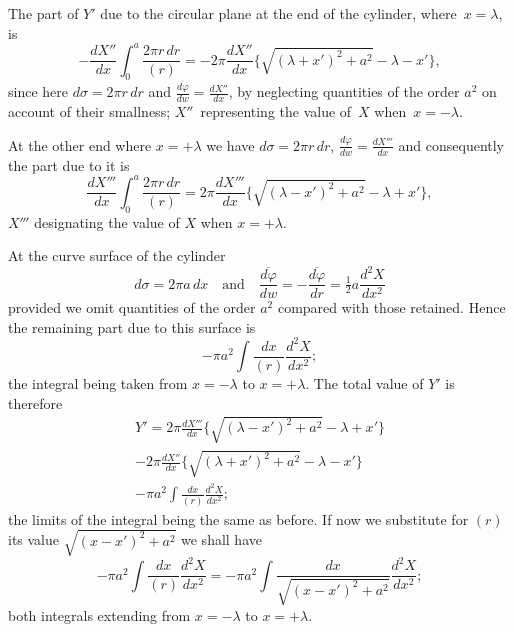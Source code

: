 \documentclass[11pt,notitlepage]{amsart}
\renewcommand{\phi}{\varphi}
\begin{document}
The part of $Y'$ due to the circular plane at the end of the cylinder,
where~$x=\lambda$, is
\[
-\frac{dX''}{dx}\int_0^a\frac{2\pi r\,dr}{(r)}
=-2\pi\frac{dX''}{dx}
\biggl\{\sqrt{(\lambda+x')^2+a^2}-\lambda-x'\biggr\},
\]
since here $d\sigma=2\pi r\,dr$
and $\frac{\overline{d\phi}}{dw}=\frac{dX''}{dx}$,
by neglecting quantities of the order
$a^2$ on account of their smallness;
$X''$~representing the value of~$X$ when~${x=-\lambda}$.

At the other end where $x=+\lambda$ we have
$d\sigma=2\pi r\,dr$, $\frac{{d\phi}}{dw}=\frac{dX'''}{dx}$
and consequently the part due to it is
\[
\frac{dX'''}{dx}\int_0^a\frac{2\pi r\,dr}{(r)}
=2\pi\frac{dX'''}{dx}
\biggl\{\sqrt{(\lambda-x')^2+a^2}-\lambda+x'\biggr\},
\]
$X'''$ designating the value of $X$ when $x=+\lambda$.

At the curve surface of the cylinder
\[
d\sigma=2\pi a\,dx
\quad\text{and}\quad
\frac{\overline{d\phi}}{dw}
=-\frac{\overline{d\phi}}{dr}
=\tfrac12a\frac{d^2X}{dx^2}
\]
provided we omit quantities of the order $a^2$ compared with those retained.
Hence the remaining part due to this surface is
\[
-\pi a^2\int\frac{dx}{(r)}\frac{d^2X}{dx^2};
\]
the integral being taken from $x=-\lambda$ to $x=+\lambda$.
The total value of $Y'$
is therefore
\begin{multline*}
Y'=
2\pi\frac{dX'''}{dx}
\biggl\{\sqrt{(\lambda-x')^2+a^2}-\lambda+x'\biggr\}\\
-2\pi\frac{dX''}{dx}
\biggl\{\sqrt{(\lambda+x')^2+a^2}-\lambda-x'\biggr\}\\
-\pi a^2\int\frac{dx}{(r)}\frac{d^2X}{dx^2};
\end{multline*}
the limits of the integral being the same as before. If now we substitute for
$(r)$ its value $\sqrt{(x-x')^2+a^2}$ we shall have
\[
-\pi a^2\int\frac{dx}{(r)}\frac{d^2X}{dx^2}
=-\pi a^2\int\frac{dx}{\sqrt{(x-x')^2+a^2}}\frac{d^2X}{dx^2};
\]
both integrals extending from $x=-\lambda$ to $x=+\lambda$.
\end{document}
